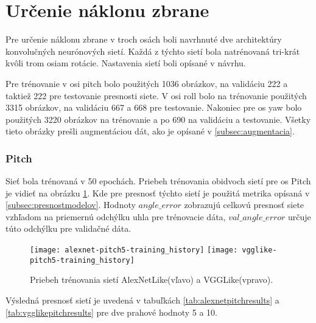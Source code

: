 
\section{Určenie náklonu zbrane}
Pre určenie náklonu zbrane v troch osách boli navrhnuté dve architektúry konvolučných neurónových sietí.
Každá z týchto sietí bola natrénovaná tri-krát kvôli trom osiam rotácie.
Nastavenia sietí boli opísané v návrhu.

Pre trénovanie v osi pitch bolo použitých 1036 obrázkov, na validáciu 222 a taktiež 222 pre testovanie presnosti siete.
V osi roll bolo na trénovanie použitých 3315 obrázkov, na validáciu 667 a 668 pre testovanie.
Nakoniec pre os yaw bolo použitých 3220 obrázkov na trénovanie a po 690 na validáciu a testovanie.
Všetky tieto obrázky prešli augmentáciou dát, ako je opísané v \ref{subsec:augmentacia}.

\subsubsection{Pitch}
Sieť bola trénovaná v 50 epochách.
Priebeh trénovania obidvoch sietí pre os Pitch je vidieť na obrázku \ref{pic:pitchaxis}.
Kde pre presnosť týchto sietí je použitá metrika opísaná v \ref{subsec:presnostmodelov}.
Hodnoty $angle\_error$ zobrazujú celkovú presnosť siete vzhľadom na priemernú odchýlku uhla pre trénovacie dáta,
    $val\_angle\_error$ určuje túto odchýlku pre validačné dáta.

\begin{figure}[H]
    \centering
    \texttt{[image: alexnet-pitch5-training\_history]}
	\texttt{[image: vgglike-pitch5-training\_history]}
	\caption{Priebeh trénovania sietí AlexNetLike(vľavo) a VGGLike(vpravo).}
	\label{pic:pitchaxis}
\end{figure}

Výsledná presnosť sietí je uvedená v tabuľkách \ref{tab:alexnetpitchresults} a \ref{tab:vgglikepitchresults} pre dve prahové hodnoty 5 a 10.

